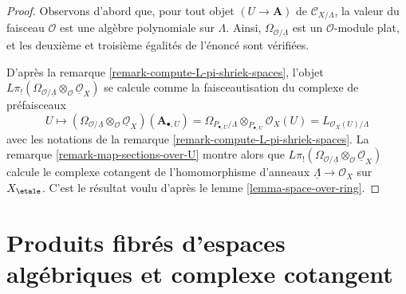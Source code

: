 \begin{proof}
Observons d'abord que, pour tout objet $(U \to \mathbf{A})$ de
$\mathcal{C}_{X/\Lambda}$, la valeur du faisceau $\mathcal{O}$ est une algèbre
polynomiale sur $\Lambda$. Ainsi,
$\Omega_{\mathcal{O}/\underline{\Lambda}}$ est un $\mathcal{O}$-module plat,
et les deuxième et troisième égalités de l'énoncé sont vérifiées.

\medskip\noindent
D'après la remarque \ref{remark-compute-L-pi-shriek-spaces}, l'objet
$L\pi_!(\Omega_{\mathcal{O}/\underline{\Lambda}}
\otimes_\mathcal{O} \underline{\mathcal{O}}_X)$
se calcule comme la faisceautisation du complexe de préfaisceaux
$$
U \mapsto
\left(\Omega_{\mathcal{O}/\underline{\Lambda}}
\otimes_\mathcal{O} \underline{\mathcal{O}}_X\right)(\mathbf{A}_{\bullet, U})
=
\Omega_{P_{\bullet, U}/\Lambda} \otimes_{P_{\bullet, U}} \mathcal{O}_X(U) =
L_{\mathcal{O}_X(U)/\Lambda}
$$
avec les notations de la remarque \ref{remark-compute-L-pi-shriek-spaces}. La
remarque \ref{remark-map-sections-over-U} montre alors que
$L\pi_!(\Omega_{\mathcal{O}/\underline{\Lambda}}
\otimes_\mathcal{O} \underline{\mathcal{O}}_X)$
calcule le complexe cotangent de l'homomorphisme d'anneaux
$\underline{\Lambda} \to \mathcal{O}_X$ sur $X_\etale$. C'est le résultat
voulu d'après le lemme \ref{lemma-space-over-ring}.
\end{proof}






\section{Produits fibrés d'espaces algébriques et complexe cotangent}
\label{section-fibre-product}

